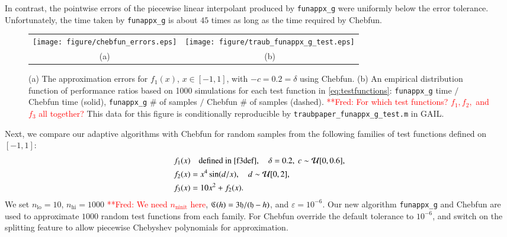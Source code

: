 \documentclass[review]{elsarticle}
\newcommand{\abstol}{\varepsilon}
\theoremstyle{definition}
\newcommand{\frednote}[1]{  {\textcolor{red}  {\mbox{**Fred:} #1}}}
\DeclareMathOperator{\ninit}{ninit}
\newtheorem{exmp}{Example}
\newcommand{\funappxg}{\texttt{funappx\_g}\xspace}
\newcommand{\funappxglobalg}{\texttt{funappxglobal\_g}\xspace}
\begin{document}
In contrast, the pointwise errors of the piecewise linear interpolant produced
by \funappxg{} were uniformly below the error tolerance. Unfortunately, the time
taken by \funappxg{} is about $45$ times as long as the time
required by Chebfun. 

\begin{figure}[tb]
\centering
\begin{tabular}{cc}
\texttt{[image: figure/chebfun\_errors.eps]} \hspace{-2.5ex} &
\texttt{[image: figure/traub\_funappx\_g\_test.eps]}
\\ (a) & (b)
\end{tabular}
\caption{(a) The approximation errors for $f_1(x)$, $x \in [-1,1]$, with $-c = 0.2=\delta$ 
using  Chebfun. 
(b) An empirical distribution function of performance ratios based on 1000
simulations for each test function in \eqref{eq:testfunctions}:
\funappxg{} time $/$ Chebfun time (solid), \funappxg{} \# of samples $/$
Chebfun \# of samples (dashed). 
\frednote{For which test functions?  $f_1, f_2,$ and $f_3$ all together?}
This data for this figure is conditionally reproducible 
by 
\texttt{traubpaper\_funappx\_g\_test.m} in GAIL.
\label{f3chebfig}} %
\end{figure}




Next, we compare our adaptive algorithms with Chebfun  for random samples from the 
following families of test functions defined on $ [-1, 1]$:
\begin{subequations} \label{eq:testfunctions}
\begin{align}
f_1(x) & \quad \text{defined in \eqref{f3def}}, \quad \delta = 0.2, \ c \sim \mathcal{U}[0,0.6], \\
f_2(x) &= x^4 \sin(d/x), \quad d \sim \mathcal{U}[0,2], \\
f_3(x) &= 10  x^2 + f_2(x).
\end{align}
\end{subequations}
We set $n_{\text{lo}} = 10$, $n_{\text{hi}} = 
1000$ \frednote{We need $n_{\ninit}$ here}, $\mathfrak{C} (h) =
3 \mathfrak{h}/(\mathfrak{h}-h)$, and $\abstol = 10^{-6}$. Our new algorithm \texttt{funappx\_g}
and Chebfun are
used to approximate $1000$ random test functions from each family. For Chebfun 
override the default tolerance to $10^{-6}$, and switch on the splitting
feature to allow piecewise Chebyshev polynomials for approximation.
\end{document}

